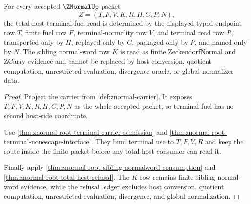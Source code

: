 \begin{theorem}
\label{thm:znormal-total-host-terminal-fuel-determinacy}
For every accepted $\ZNormalUp$ packet
$$
Z=(T,F,V,K,R,H,C,P,N),
$$
the total-host terminal-fuel read is determined by the displayed typed endpoint row $T$, finite fuel row $F$, terminal-normality row $V$, and terminal read row $R$, transported only by $H$, replayed only by $C$, packaged only by $P$, and named only by $N$. The sibling normal-word row $K$ is read as finite ZeckendorfNormal and ZCarry evidence and cannot be replaced by host conversion, quotient computation, unrestricted evaluation, divergence oracle, or global normalizer data.
\end{theorem}
\begin{proof}
Project the carrier from \autoref{def:znormal-carrier}. It exposes $T,F,V,K,R,H,C,P,N$ as the whole accepted packet, so terminal fuel has no second host-side coordinate.

Use \autoref{thm:znormal-root-terminal-carrier-admission} and \autoref{thm:znormal-root-terminal-nonescape-interface}. They bind terminal use to $T,F,V,R$ and keep the route inside the finite packet before any total-host consumer can read it.

Finally apply \autoref{thm:znormal-root-sibling-normalword-consumption} and \autoref{thm:znormal-root-total-host-refusal}. The $K$ row remains finite sibling normal-word evidence, while the refusal ledger excludes host conversion, quotient computation, unrestricted evaluation, divergence, and global normalization.
\end{proof}

